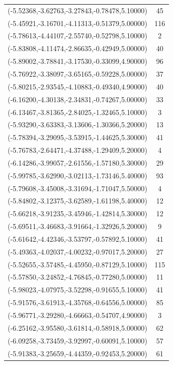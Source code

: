 \documentclass[12pt, fullpage,letterpaper]{article}
\begin{document}
\begin{longtable}{c|c}
(-5.52368,-3.62763,-3.27843,-0.78478,5.10000) & 45 \\
(-5.45921,-3.16701,-4.11313,-0.51379,5.00000) & 116 \\
(-5.78613,-4.44107,-2.55740,-0.52798,5.10000) & 2 \\
(-5.83808,-4.11474,-2.86635,-0.42949,5.00000) & 40 \\
(-5.89002,-3.78841,-3.17530,-0.33099,4.90000) & 96 \\
(-5.76922,-3.38097,-3.65165,-0.59228,5.00000) & 37 \\
(-5.80215,-2.93545,-4.10883,-0.49340,4.90000) & 40 \\
(-6.16200,-4.30138,-2.34831,-0.74267,5.00000) & 33 \\
(-6.13467,-3.81365,-2.84025,-1.32465,5.10000) & 3 \\
(-5.93290,-3.63383,-3.13606,-1.30366,5.20000) & 13 \\
(-5.78394,-3.29095,-3.53915,-1.44625,5.30000) & 41 \\
(-5.76783,-2.64471,-4.37488,-1.29409,5.20000) & 4 \\
(-6.14286,-3.99057,-2.61556,-1.57180,5.30000) & 29 \\
(-5.99785,-3.62990,-3.02113,-1.73146,5.40000) & 93 \\
(-5.79608,-3.45008,-3.31694,-1.71047,5.50000) & 4 \\
(-5.84802,-3.12375,-3.62589,-1.61198,5.40000) & 12 \\
(-5.66218,-3.91235,-3.45946,-1.42814,5.30000) & 12 \\
(-5.69511,-3.46683,-3.91664,-1.32926,5.20000) & 9 \\
(-5.61642,-4.42346,-3.53797,-0.57892,5.10000) & 41 \\
(-5.49363,-4.02037,-4.00232,-0.97017,5.20000) & 27 \\
(-5.52655,-3.57485,-4.45950,-0.87129,5.10000) & 115 \\
(-5.57850,-3.24852,-4.76845,-0.77280,5.00000) & 11 \\
(-5.98023,-4.07975,-3.52298,-0.91655,5.10000) & 41 \\
(-5.91576,-3.61913,-4.35768,-0.64556,5.00000) & 85 \\
(-5.96771,-3.29280,-4.66663,-0.54707,4.90000) & 3 \\
(-6.25162,-3.95580,-3.61814,-0.58918,5.00000) & 62 \\
(-6.09258,-3.73459,-3.92997,-0.60091,5.10000) & 57 \\
(-5.91383,-3.25659,-4.44359,-0.92453,5.20000) & 61 \\

\end{longtable}
\end{document}

